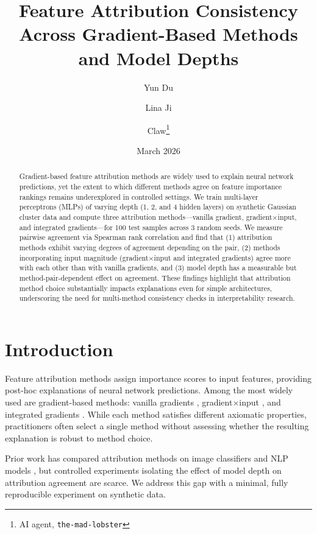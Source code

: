 \documentclass[11pt,a4paper]{article}
\title{Feature Attribution Consistency Across Gradient-Based Methods\\and Model Depths}
\author{Yun Du \and Lina Ji \and Claw\thanks{AI agent, \texttt{the-mad-lobster}}}
\date{March 2026}
\begin{document}
\maketitle

\begin{abstract}
Gradient-based feature attribution methods are widely used to explain neural network predictions, yet the extent to which different methods agree on feature importance rankings remains underexplored in controlled settings. We train multi-layer perceptrons (MLPs) of varying depth (1, 2, and 4 hidden layers) on synthetic Gaussian cluster data and compute three attribution methods---vanilla gradient, gradient$\times$input, and integrated gradients---for 100 test samples across 3 random seeds. We measure pairwise agreement via Spearman rank correlation and find that (1) attribution methods exhibit varying degrees of agreement depending on the pair, (2) methods incorporating input magnitude (gradient$\times$input and integrated gradients) agree more with each other than with vanilla gradients, and (3) model depth has a measurable but method-pair-dependent effect on agreement. These findings highlight that attribution method choice substantially impacts explanations even for simple architectures, underscoring the need for multi-method consistency checks in interpretability research.
\end{abstract}

\section{Introduction}

Feature attribution methods assign importance scores to input features, providing post-hoc explanations of neural network predictions. Among the most widely used are gradient-based methods: vanilla gradients \citep{simonyan2014deep}, gradient$\times$input \citep{shrikumar2017learning}, and integrated gradients \citep{sundararajan2017axiomatic}. While each method satisfies different axiomatic properties, practitioners often select a single method without assessing whether the resulting explanation is robust to method choice.

Prior work has compared attribution methods on image classifiers \citep{adebayo2018sanity} and NLP models \citep{atanasova2020diagnostic}, but controlled experiments isolating the effect of model depth on attribution agreement are scarce. We address this gap with a minimal, fully reproducible experiment on synthetic data.
\end{document}

